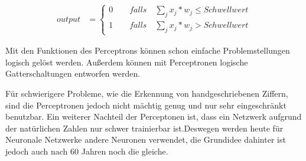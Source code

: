 \documentclass[../main.tex]{subfiles}
\begin{document}
\begin{align}
	output &= \left \{ \begin{matrix}
	0 \qquad falls \quad \sum_{j} x_{j}*w_{j} \leq Schwellwert \\ 
	1 \qquad falls \quad \sum_{j} x_{j}*w_{j} > Schwellwert
	\end{matrix} \right.
\end{align}

Mit den Funktionen des Perceptrons können schon einfache Problemstellungen logisch gelöst werden. Außerdem können mit Perceptronen logische Gatterschaltungen entworfen werden.

Für schwierigere Probleme, wie die Erkennung von handgeschriebenen Ziffern, sind die Perceptronen jedoch nicht mächtig genug und nur sehr eingeschränkt benutzbar. Ein weiterer Nachteil der Perceptonen ist, dass ein Netzwerk aufgrund der natürlichen Zahlen nur schwer trainierbar ist.Deswegen werden heute für Neuronale Netzwerke andere Neuronen verwendet, die Grundidee dahinter ist jedoch auch nach 60 Jahren noch die gleiche.
\end{document}
